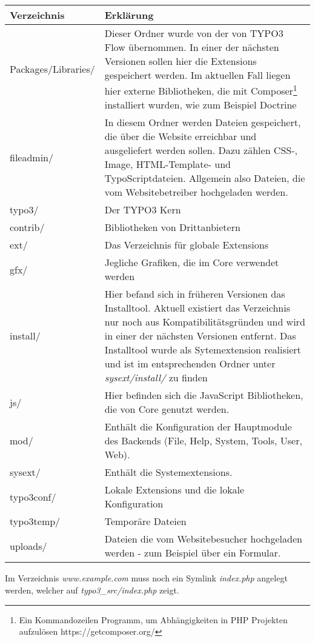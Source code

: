 \begin{tabularx}{\textwidth}{|X|X|}
	\hline
	Verzeichnis & Erklärung\\
	\hline
	Packages/Libraries/ & Dieser Ordner wurde von der von TYPO3 Flow übernommen. In einer der nächsten Versionen sollen hier die Extensions gespeichert werden. Im aktuellen Fall liegen hier externe Bibliotheken, die mit Composer\footnote{Ein Kommandozeilen Programm, um Abhängigkeiten in PHP Projekten aufzulösen https://getcomposer.org/} installiert wurden, wie zum Beispiel Doctrine\\
	\hline
	fileadmin/ & In diesem Ordner werden Dateien gespeichert, die über die Website erreichbar und ausgeliefert werden sollen. Dazu zählen CSS-, Image, HTML-Template- und TypoScriptdateien. Allgemein also Dateien, die vom Websitebetreiber hochgeladen werden.\\
	\hline
	typo3/ & Der TYPO3 Kern\\
	\hline
	contrib/ & Bibliotheken von Drittanbietern\\
	\hline
	  ext/ & Das Verzeichnis für globale Extensions \\
	\hline
	  gfx/ & Jegliche Grafiken, die im Core verwendet werden \\
	\hline
	  install/ & Hier befand sich in früheren Versionen das Installtool. Aktuell existiert das Verzeichnis nur noch aus Kompatibilitätsgründen und wird in einer der nächsten Versionen entfernt. Das Installtool wurde als Sytemextension realisiert und ist im entsprechenden Ordner unter \textit{sysext/install/} zu finden\\
	\hline
	  js/ & Hier befinden sich die JavaScript Bibliotheken, die von Core genutzt werden.\\
	\hline
	  mod/ & Enthält die Konfiguration der Hauptmodule des Backends (File, Help, System, Tools, User, Web).\\
	\hline
	  sysext/ & Enthält die Systemextensions.\\
	\hline
	typo3conf/ & Lokale Extensions und die lokale Konfiguration\\
	\hline
	typo3temp/ & Temporäre Dateien\\
	\hline
	uploads/ & Dateien die vom Websitebesucher hochgeladen werden - zum Beispiel über ein Formular.\\
	\hline
\end{tabularx}

Im Verzeichnis \textit{www.example.com} muss noch ein Symlink \textit{index.php} angelegt werden, welcher auf \textit{typo3\_src/index.php} zeigt.

